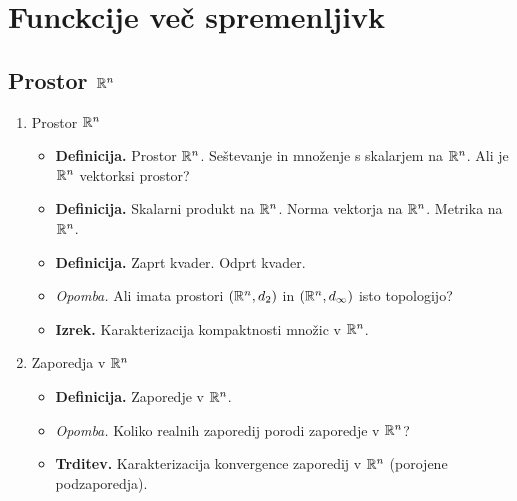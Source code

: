 \section{Funckcije več spremenljivk}
\subsection{Prostor $\mathbb{R}^n$}
\begin{enumerate}
    \item Prostor $\mathbb{R}^n$
    \begin{itemize}
        \item \colorbox{purple!30}{\textbf{Definicija.}} Prostor $\mathbb{R}^n$. Seštevanje in množenje s skalarjem na $\mathbb{R}^n$. Ali je $\mathbb{R}^n$ vektorksi prostor?
        \item \colorbox{purple!30}{\textbf{Definicija.}} Skalarni produkt na $\mathbb{R}^n$. Norma vektorja na $\mathbb{R}^n$. Metrika na $\mathbb{R}^n$.
        \item \colorbox{purple!30}{\textbf{Definicija.}} Zaprt kvader. Odprt kvader.
        \item \colorbox{yellow!30}{\emph{Opomba.}} Ali imata prostori $(\mathbb{R}^n, d_2)$ in $(\mathbb{R}^n, d_\infty)$ isto topologijo?
        \item \colorbox{blue!30}{\textbf{Izrek.}} Karakterizacija kompaktnosti množic v $\mathbb{R}^n$. \todo{*}
    \end{itemize}

    \item Zaporedja v $\mathbb{R}^n$
    \begin{itemize}
        \item \colorbox{purple!30}{\textbf{Definicija.}} Zaporedje v $\mathbb{R}^n$.
        \item \colorbox{yellow!30}{\emph{Opomba.}} Koliko realnih zaporedij porodi zaporedje v $\mathbb{R}^n$?
        \item \colorbox{blue!30}{\textbf{Trditev.}} Karakterizacija konvergence zaporedij v $\mathbb{R}^n$ (porojene podzaporedja).
    \end{itemize}
\end{enumerate}

